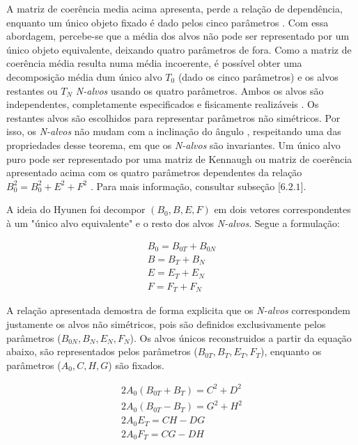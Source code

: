 \documentclass[a4paper,12pt]{article}
\begin{document}
A matriz de coerência media acima apresenta, perde a relação de dependência, enquanto um único objeto fixado é dado pelos cinco parâmetros \cite{jong:2009}. Com essa abordagem, percebe-se que a média dos alvos não pode ser representado por um único objeto equivalente, deixando quatro parâmetros de fora. Como a matriz de coerência média resulta numa média incoerente, é possível obter uma decomposição média dum único alvo $T_{0}$ (dado os cinco parâmetros) e os alvos restantes ou $T_{N}$ \textit{N-alvos} usando os quatro parâmetros. Ambos os alvos são independentes, completamente especificados e fisicamente realizáveis \cite{jong:2009}. Os restantes alvos são escolhidos para representar parâmetros não simétricos. Por isso, os \textit{N-alvos} não mudam com a inclinação do ângulo \cite{jong:2009}, respeitando uma das propriedades desse teorema, em que os \textit{N-alvos} são invariantes. Um único alvo puro pode ser representado por uma matriz de Kennaugh ou matriz de coerência apresentado acima com os quatro parâmetros dependentes da relação $B^2_{0}=B^2_{0}+E^2+F^2$ \cite{jong:2009}. Para mais informação, consultar \cite{jong:2009} subseção [$6.2.1$].

A ideia do Hyunen foi decompor $(B_{0}, B, E, F)$ em dois vetores correspondentes à um "único alvo equivalente" e o resto dos alvos \textit{N-alvos}. Segue a formulação:

\begin{equation}
    \begin{split}
            B_{0} = B_{0T} + B_{0N} \\ B = B_{T}+B_{N} \\
            E = E_{T} + E_{N} \\ F = F_{T}+F_{N}
    \end{split}
\end{equation}

A relação apresentada demostra de forma explicita que os \textit{N-alvos}  correspondem justamente os alvos não simétricos, pois são definidos exclusivamente pelos parâmetros ($B_{0N}, B_{N}, E_{N}, F_{N}$). Os alvos únicos reconstruidos a partir da equação abaixo, são representados pelos parâmetros ($B_{0T}, B_{T}, E_{T}, F_{T}$), enquanto os parâmetros ($A_{0} , C, H, G$) são fixados.

\begin{equation}
    \begin{split}
        2A_{0} (B_{0T} + B_{T} ) = C^2 + D^2 \\ 2A_{0} (B_{0T}-B_{T}) = G^2 + H^2\\
        2A_{0} E_{T} = CH-DG \\ 2A_{0} F_{T} = CG-DH
    \end{split}
\end{equation}
\end{document}
